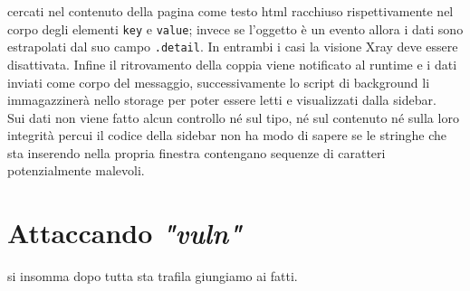 \documentclass{sapthesis}
\newcommand{\code}[1]{\texttt{#1}}
\newcommand{\attr}[1]{\code{.#1}}
\newcommand{\vuln}{\textit{"vuln"}}
\begin{document}
        cercati nel contenuto della pagina come testo html racchiuso rispettivamente nel corpo
        degli elementi \code{key} e \code{value}; invece se l'oggetto è un evento allora i
        dati sono estrapolati dal suo campo \attr{detail}. In entrambi i casi la visione Xray
        deve essere disattivata.
        Infine il ritrovamento della coppia viene notificato al runtime e i dati inviati come
        corpo del messaggio, successivamente lo script di background li immagazzinerà nello
        storage per poter essere letti e visualizzati dalla sidebar.\\
        Sui dati non viene fatto alcun controllo né sul tipo, né sul contenuto né sulla loro
        integrità percui il codice della sidebar non ha modo di sapere se le stringhe che sta
        inserendo nella propria finestra contengano sequenze di caratteri potenzialmente malevoli.


\chapter{Attaccando \vuln}
\label{cap:attaccando-vuln}
    si insomma dopo tutta sta trafila giungiamo ai fatti.
\end{document}
